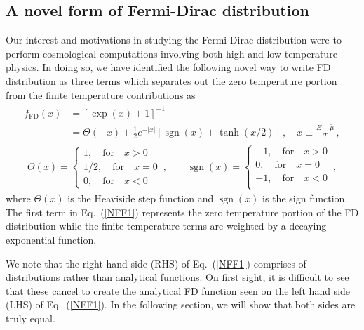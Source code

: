 \documentclass[sn-mathphys,Numbered]{sn-jnl}
\newcommand{\req}[1]{Eq.~(\ref{#1})}
\DeclareMathOperator{\sgn}{sgn}
\newcommand*{\ar}{{\color{red}\text{ (Citation!) }}}
\begin{document}
\subsection{A novel form of Fermi-Dirac distribution}
Our interest and motivations in studying the Fermi-Dirac distribution were to perform cosmological computations involving both high and low temperature physics. In doing so, we have identified the following novel way to write FD distribution as three terms which separates out the zero temperature portion from the finite temperature contributions as 
\begin{align}
\label{NFF1}
\begin{split}
f_\mathrm{FD}(x)
&=\left[\exp(x)+1\right]^{-1}\\
&=\Theta(-x)+\frac{1}{2}e^{-|x|}\left[\sgn(x)+\tanh(x/2)\right]\,,\quad
x\equiv\frac{E-\widetilde\mu}{T}\,,
\end{split}
\end{align}
\begin{align}
\Theta(x)=\left\{
\begin{array}{r}
1,\quad\mathrm{for}\quad{x}>0\\
1/2,\quad\mathrm{for}\quad{x}=0\\
0,\quad\mathrm{for}\quad{x}<0
\end{array}\right.\,,\qquad
\sgn(x)=\left\{
\begin{array}{r}
+1,\quad\mathrm{for}\quad{x}>0\\
0,\quad\mathrm{for}\quad{x}=0\\
-1,\quad\mathrm{for}\quad{x}<0\\
\end{array}\right.\,,
\end{align}
where $\Theta(x)$ is the Heaviside step function and $\sgn(x)$ is the sign function. The first term in \req{NFF1} represents the zero temperature portion of the FD distribution while the finite temperature terms are weighted by a decaying exponential function.

We note that the right hand side (RHS) of \req{NFF1} comprises of distributions rather than analytical functions\ar. On first sight, it is difficult to see that these cancel to create the analytical FD function seen on the left hand side (LHS) of \req{NFF1}. In the following section, we will show that both sides are truly equal.
\end{document}
